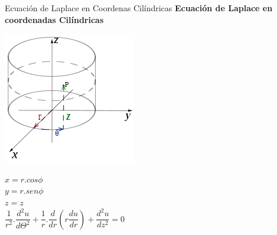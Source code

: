 \documentclass[11pt]{beamer}
\begin{document}
\begin{frame}{Ecuación de Laplace en Coordenas Cilíndricas}
\textbf{Ecuación de Laplace en coordenadas Cilíndricas}\\
\begin{center}
\includegraphics[scale=0.4]{esf.png} 
\end{center}
\begin{center}
$x=r.cos\phi$\\ 
$y=r.sen\phi$\\
$z=z$\\
$\dfrac{1}{r^{2}}.\dfrac{d^{2}u}{d\Theta^{2}}+\dfrac{1}{r}.\dfrac{d}{dr}(r\dfrac{du}{dr})+\dfrac{d^{2}u}{dz^{2}}=0$
\end{center}

\end{frame}
\end{document}
